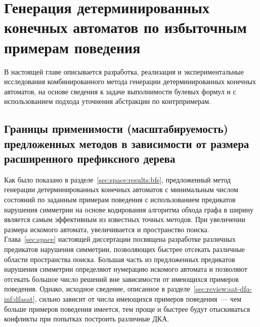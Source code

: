
\chapter{Генерация детерминированных конечных автоматов по избыточным примерам поведения} 
\label{sec:cegar}

В настоящей главе описывается разработка, реализация и экспериментальные исследования комбинированного метода генерации детерминированных конечных автоматов, на основе сведения к задаче выполнимости булевых формул и с использованием подхода уточнения абстракции по контрпримерам.

\section{Границы применимости (масштабируемость) предложенных методов в зависимости от размера расширенного префиксного дерева} 
\label{sec:cegar:motivation}

Как было показано в разделе~\ref{sec:space:results:bfs}, предложенный метод генерации детерминированных конечных автоматов с минимальным числом состояний по заданным примерам поведения с использованием предикатов нарушения симметрии на основе кодирования алгоритма обхода графа в ширину является самым эффективным из известных точных методов.
При увеличении размера искомого автомата, увеличивается и пространство поиска.
Глава~\ref{sec:space} настоящей диссертации посвящена разработке различных предикатов нарушения симметрии, позволяющих быстрее отсекать различные области пространства поиска.
Большая часть из предложенных предикатов нарушения симметрии определяют нумерацию искомого автомата и позволяют отсекать большое число решений вне зависимости от имеющихся примеров поведения.
Однако, исходное сведение, описанное в разделе~\ref{sec:review:sat-dfa-inf:dfasat}, сильно зависит от числа имеющихся примеров поведения~--- чем больше примеров поведения имеется, тем проще и быстрее будут отыскиваться конфликты при попытках построить различные ДКА.

